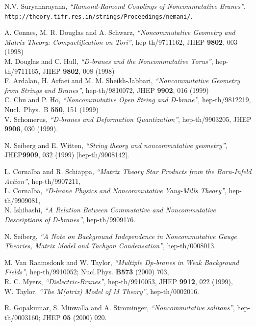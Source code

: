 \documentclass[a4paper,a4paper]{amsproc}
\theoremstyle{definition}
\theoremstyle{remark}
\numberwithin{equation}{section}
\begin{document}

\begin{thebibliography}{A}

 N.V. Suryanarayana, \textit{``Ramond-Ramond
Couplings of Noncommutative Branes''},
{\tt http://theory.tifr.res.in/strings/Proceedings/nemani/}.

 A. Connes, M. R. Douglas and A. Schwarz,
\textit{``Noncommutative Geometry and Matrix Theory: Compactification 
on Tori''}, hep-th/9711162, JHEP {\bf 9802}, 003 (1998)\\
M. Douglas and C. Hull, \textit{``D-branes and the 
Noncommutative Torus''}, hep-th/9711165, JHEP {\bf 9802}, 008 
(1998)\\
F. Ardalan, H. Arfaei and M. M. Sheikh-Jabbari,
\textit{``Noncommutative Geometry from Strings and Branes''},
hep-th/9810072, JHEP {\bf 9902}, 016 (1999)\\
C. Chu and P. Ho,
\textit{``Noncommutative Open String and D-brane''},
hep-th/9812219, Nucl.\ Phys.\ B {\bf 550}, 151 (1999)\\
V. Schomerus, \textit{``D-branes and Deformation
Quantization''}, hep-th/9903205, JHEP {\bf 9906}, 030 (1999).

 N. Seiberg and E. Witten, \textit{``String theory and
noncommutative geometry''}, JHEP{\bf 9909}, 032 (1999)
[hep-th/9908142].

 L. Cornalba and R. Schiappa, \textit{ ``Matrix
Theory Star Products from the Born-Infeld Action''}, hep-th/9907211,\\
L. Cornalba, \textit{ ``D-brane Physics and Noncommutative Yang-Mills
Theory''}, hep-th/9909081, \\
N. Ishibashi, \textit{``A Relation Between
Commutative and Noncommutative Descriptions of D-branes''},
hep-th/9909176.

 N. Seiberg, \textit{``A Note on Background
Independence in Noncommutative Gauge Theories, Matrix Model and
Tachyon Condensation''}, hep-th/0008013.

 M. Van Raamsdonk and W. Taylor, \textit{``Multiple
Dp-branes in Weak Background Fields''}, hep-th/9910052;
Nucl.Phys. {\bf B573} (2000) 703,\\
R. C. Myers, \textit{``Dielectric-Branes''}, hep-th/9910053,
JHEP {\bf 9912}, 022 (1999),\\
W. Taylor, \textit{ ``The M(atrix) Model of M
Theory''}, hep-th/0002016.

 R. Gopakumar, S. Minwalla and A. Strominger,
\textit{``Noncommutative solitons''}, hep-th/0003160; JHEP {\bf 05}
(2000) 020.


\end{thebibliography}
\end{document}
